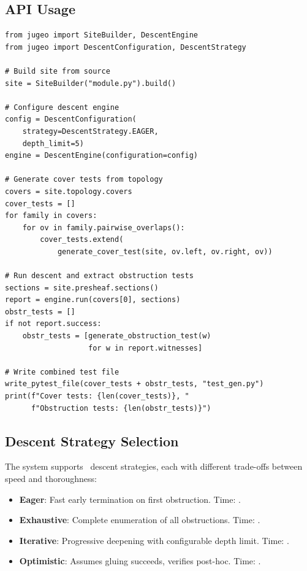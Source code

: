 \documentclass[11pt]{article}
\begin{document}
\subsection{API Usage}
\begin{lstlisting}[style=jugeo-python]
from jugeo import SiteBuilder, DescentEngine
from jugeo import DescentConfiguration, DescentStrategy

# Build site from source
site = SiteBuilder("module.py").build()

# Configure descent engine
config = DescentConfiguration(
    strategy=DescentStrategy.EAGER,
    depth_limit=5)
engine = DescentEngine(configuration=config)

# Generate cover tests from topology
covers = site.topology.covers
cover_tests = []
for family in covers:
    for ov in family.pairwise_overlaps():
        cover_tests.extend(
            generate_cover_test(site, ov.left, ov.right, ov))

# Run descent and extract obstruction tests
sections = site.presheaf.sections()
report = engine.run(covers[0], sections)
obstr_tests = []
if not report.success:
    obstr_tests = [generate_obstruction_test(w)
                   for w in report.witnesses]

# Write combined test file
write_pytest_file(cover_tests + obstr_tests, "test_gen.py")
print(f"Cover tests: {len(cover_tests)}, "
      f"Obstruction tests: {len(obstr_tests)}")
\end{lstlisting}

\subsection{Descent Strategy Selection}

The system supports \subDescentStrategies\ descent strategies, each with
different trade-offs between speed and thoroughness:

\begin{itemize}[noitemsep]
  \item \textbf{Eager}: Fast early termination on first obstruction.
        Time: \subDescentEagerTime.
  \item \textbf{Exhaustive}: Complete enumeration of all obstructions.
        Time: \subDescentExhaustiveTime.
  \item \textbf{Iterative}: Progressive deepening with configurable
        depth limit.  Time: \subDescentIterativeTime.
  \item \textbf{Optimistic}: Assumes gluing succeeds, verifies post-hoc.
        Time: \subDescentOptimisticTime.
\end{itemize}
\end{document}
